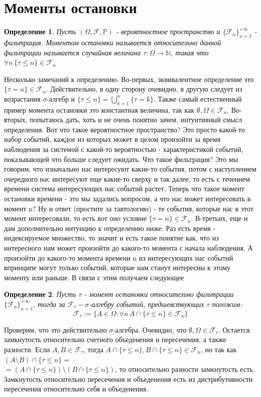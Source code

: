 \documentclass[12pt,a4paper]{article} %
\newtheorem{definition}{Определение}
\newcommand{\PR}{\mathbb{P}}
\newcommand{\F}{\mathcal{F}}
\begin{document}
	\section{Моменты остановки}
	\begin{definition}
		Пусть $(\Omega,\F,\PR)$ - вероятностное пространство и $\{\F_n\}_{n=1}^{+\infty}$ - фильтрация. Моментом остановки называется относительно данной фильтрации называется случайная величина $\tau:\Omega\rightarrow\mathbb{N}$, такая что $\forall n\,\{\tau\leq n\}\in\F_n$
	\end{definition}
	Несколько замечаний к определению. Во-первых, эквивалентное определение это $\{\tau=n\}\in\F_n$. Действительно, в одну сторону очевидно, в другую следует из возрастания $\sigma$-алгебр и $\{\tau\leq n\}=\bigcup_{k=1}^n\{\tau=k\}$. Также самый естественный пример момента остановки это константная величина, так как $\emptyset,\Omega\in\F_n$. Во-вторых, попытаюсь дать, хоть и не очень понятно зачем, интуитивный смысл определения. Вот что такое вероятностное пространство? Это просто какой-то набор событий, каждое из которых может в целом произойти за время наблюдения за системой с какой-то вероятностью - характеристикой событий, показывающей что больше следует ожидать. Что такое фильтрация? Это мы говорим, что изначально нас интересуют какие-то события, потом с наступлением очередного нас интересуют еще какие-то сверху и так далее, то есть с течением времени система интересующих нас событий растет. Теперь что такое момент остановки времени - это мы задались вопросом, а что нас может интересовать в момент n? Ну и ответ (простите за тавтологию) - те события, которые нас в этот момент интересовали, то есть вот оно условие $\{\tau=n\}\in\F_n$. В-третьих, еще и дам дополнительно интуицию к определению ниже. Раз есть время - индексируемое множество, то значит и есть такое понятие как, что из интересного нам может произойти до какого-то момента с начала наблюдения. А произойти до какого-то момента времени n из интересующих нас событий впринципе могут только событий, которые нам станут интересны к этому моменту или раньше. В связи с этим получаем следующее
	\begin{definition}
		Пусть $\tau$ - момент остановки относительно фильтрации $\{\F_n\}_{n=1}^{+\infty}$, тогда за $\F_{\tau}-\sigma$-алгебру событий, предшевствующих $\tau$ положим:
		$$\F_{\tau}:=\{A\in\Omega:\forall n\,A\cap\{\tau\leq n\}\in\F_n\}$$
	\end{definition}
	Проверим, что это действительно $\sigma$-алгебра. Очевидно, что $\emptyset,\Omega\in\F_{\tau}$. Остается замкнутость относительно счетного объеденения и пересечения, а также разности. Если $A,B\in\F_{\tau}$, тогда $A\cap\{\tau\leq n\},B\cap\{\tau\leq n\}\in\F_n$, но так как $(A\setminus B)\cap\{\tau\leq n\}=$\\$=(A\cap\{\tau\leq n\})\setminus(B\cap\{\tau\leq n\})$, то относительно разности замкнутость есть. Замкнутость относительно пересечения и объеденения есть из дистрибутивности пересечения относительно себя и объеденения.
\end{document}
